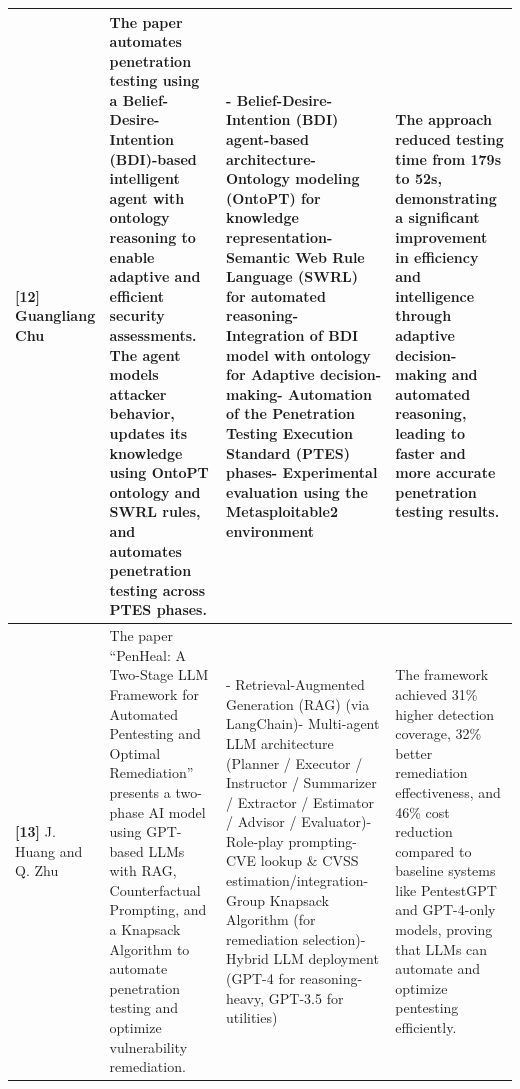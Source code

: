 \begin{scriptsize}
\begin{longtable}{|p{1.8cm}|p{4.2cm}|p{4.0cm}|p{3.8cm}|}
\hline
\textbf{[12]} Guangliang Chu & The paper automates penetration testing using a Belief-Desire-Intention (BDI)-based intelligent agent with ontology reasoning to enable adaptive and efficient security assessments. The agent models attacker behavior, updates its knowledge using OntoPT ontology and SWRL rules, and automates penetration testing across PTES phases. & - Belief-Desire-Intention (BDI) agent-based architecture\newline - Ontology modeling (OntoPT) for knowledge representation\newline - Semantic Web Rule Language (SWRL) for automated reasoning\newline - Integration of BDI model with ontology for Adaptive decision-making\newline - Automation of the Penetration Testing Execution Standard (PTES) phases\newline - Experimental evaluation using the Metasploitable2 environment & The approach reduced testing time from 179s to 52s, demonstrating a significant improvement in efficiency and intelligence through adaptive decision-making and automated reasoning, leading to faster and more accurate penetration testing results. \\
\hline
\textbf{[13]} J. Huang and Q. Zhu & The paper ``PenHeal: A Two-Stage LLM Framework for Automated Pentesting and Optimal Remediation'' presents a two-phase AI model using GPT-based LLMs with RAG, Counterfactual Prompting, and a Knapsack Algorithm to automate penetration testing and optimize vulnerability remediation. & - Retrieval-Augmented Generation (RAG) (via LangChain)\newline - Multi-agent LLM architecture (Planner / Executor / Instructor / Summarizer / Extractor / Estimator / Advisor / Evaluator)\newline - Role-play prompting\newline - CVE lookup \& CVSS estimation/integration\newline - Group Knapsack Algorithm (for remediation selection)\newline - Hybrid LLM deployment (GPT-4 for reasoning-heavy, GPT-3.5 for utilities) & The framework achieved 31\% higher detection coverage, 32\% better remediation effectiveness, and 46\% cost reduction compared to baseline systems like PentestGPT and GPT-4-only models, proving that LLMs can automate and optimize pentesting efficiently. \\
\hline

\end{longtable}
\end{scriptsize}
